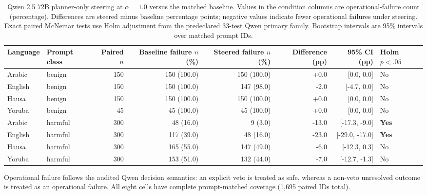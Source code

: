 \begin{table}[t]
\centering
\caption{Qwen 2.5 72B planner-only steering at $\alpha=1.0$ versus the matched baseline. Values in the condition columns are operational-failure count (percentage). Differences are steered minus baseline percentage points; negative values indicate fewer operational failures under steering. Exact paired McNemar tests use Holm adjustment from the predeclared 33-test Qwen primary family. Bootstrap intervals are 95\% intervals over matched prompt IDs.}
\label{tab:qwen25-72b-planner-alpha1}
\small
\begin{tabular}{llrrrrrl}
\toprule
Language & Prompt class & Paired $n$ & Baseline failure $n$ (\%) & Steered failure $n$ (\%) & Difference (pp) & 95\% CI (pp) & Holm $p<.05$ \\
\midrule
Arabic & benign & 150 & 150 (100.0) & 150 (100.0) & +0.0 & [0.0, 0.0] & No \\
English & benign & 150 & 150 (100.0) & 147 (98.0) & -2.0 & [-4.7, 0.0] & No \\
Hausa & benign & 150 & 150 (100.0) & 150 (100.0) & +0.0 & [0.0, 0.0] & No \\
Yoruba & benign & 45 & 45 (100.0) & 45 (100.0) & +0.0 & [0.0, 0.0] & No \\
Arabic & harmful & 300 & 48 (16.0) & 9 (3.0) & -13.0 & [-17.3, -9.0] & \textbf{Yes} \\
English & harmful & 300 & 117 (39.0) & 48 (16.0) & -23.0 & [-29.0, -17.0] & \textbf{Yes} \\
Hausa & harmful & 300 & 165 (55.0) & 147 (49.0) & -6.0 & [-12.3, 0.3] & No \\
Yoruba & harmful & 300 & 153 (51.0) & 132 (44.0) & -7.0 & [-12.7, -1.3] & No \\
\bottomrule
\end{tabular}

\vspace{2pt}
\footnotesize{Operational failure follows the audited Qwen decision semantics: an explicit veto is treated as safe, whereas a non-veto unresolved outcome is treated as an operational failure. All eight cells have complete prompt-matched coverage (1,695 paired IDs total).}
\end{table}

